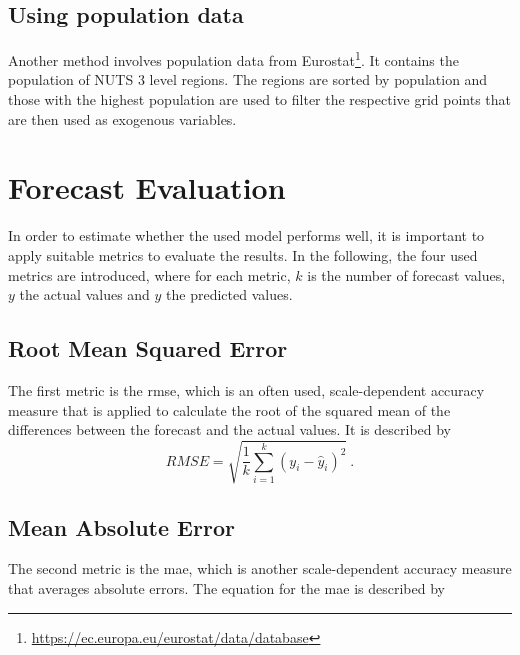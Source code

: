 \subsection{Using population data}

Another method involves population data from Eurostat\footnote{\url{https://ec.europa.eu/eurostat/data/database}}. It contains the population of NUTS 3 level regions. The regions are sorted by population and those with the highest population are used to filter the respective grid points that are then used as exogenous variables.\\


\section{Forecast Evaluation}
\label{sec:fceval}

In order to estimate whether the used model performs well, it is important to apply suitable metrics to evaluate the results. In the following, the four used metrics are introduced, where for each metric, $k$ is the number of forecast values, $y$ the actual values and $\hat{y}$ the predicted values.\\

\subsection{Root Mean Squared Error}

The first metric is the \gls{rmse}, which is an often used, scale-dependent accuracy measure that is applied to calculate the root of the squared mean of the differences between the forecast and the actual values. It is described by\\

\begin{equation}
RMSE = \sqrt{\frac{1}{k} \sum_{i=1}^{k} (y_i-\hat{y}_i)^2}~.
\label{eq:rmse}
\end{equation}

\subsection{Mean Absolute Error}

The second metric is the \gls{mae}, which is another scale-dependent accuracy measure that averages absolute errors. The equation for the \gls{mae} is described by\\

